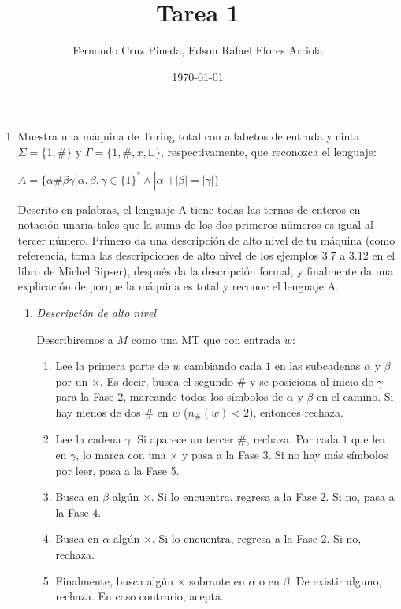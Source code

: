 \documentclass{article}
\title{Tarea 1}
\author{Fernando Cruz Pineda, Edson Rafael Flores Arriola}
\date{\today}
\newcommand{\lt}{<}
\begin{document}
\maketitle

\begin{enumerate}
\item Muestra una máquina de Turing total con alfabetos de entrada y cinta $\Sigma = \{1,\#\}$ y  $\Gamma=\{1,\#,x,\sqcup \}$, respectivamente, que reconozca el lenguaje:

  $A = \{\alpha \# \beta \gamma | \alpha,\beta,\gamma \in \{1\}^* \land |\alpha| + |\beta| = |\gamma| \}$

  Descrito en palabras, el lenguaje A tiene todas las ternas de enteros en notación unaria tales
que la suma de los dos primeros números es igual al tercer número.
Primero da una descripción de alto nivel de tu máquina (como referencia, toma las descripciones de alto nivel de los ejemplos 3.7 a 3.12 en el libro de Michel Sipser), después da la descripción formal, y finalmente da una explicación de porque la máquina es total y reconoc el lenguaje A.

\begin{enumerate}
    \item \textit{Descripción de alto nivel}

Describiremos a $M$ como una MT que con entrada $w$:

\begin{enumerate}
    \item Lee la primera parte de $w$ cambiando cada $1$ en las subcadenas $\alpha$ y $\beta$ por un $\times$. Es decir, busca el segundo $\#$ y se posiciona al inicio de $\gamma$ para la Fase 2, marcando todos los símbolos de $\alpha$ y $\beta$ en el camino. Si hay menos de dos $\#$ en $w$ ($n_\#(w) \lt 2$), entonces rechaza.
    \item Lee la cadena $\gamma$. Si aparece un tercer $\#$, rechaza. Por cada $1$ que lea en $\gamma$, lo marca con una $\times$ y pasa a la Fase 3. Si no hay más símbolos por leer, pasa a la Fase 5.
    \item Busca en $\beta$ algún $\times$. Si lo encuentra, regresa a la Fase 2. Si no, pasa a la Fase 4.
    \item Busca en $\alpha$ algún $\times$. Si lo encuentra, regresa a la Fase 2. Si no, rechaza.
    \item Finalmente, busca algún $\times$ sobrante en $\alpha$ o en $\beta$. De existir alguno, rechaza. En caso contrario, acepta.
\end{enumerate}


\end{enumerate}
\end{enumerate}
\end{document}
